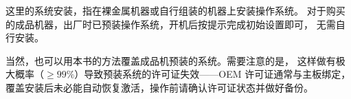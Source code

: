 这里的系统安装，指在裸金属机器或自行组装的机器上安装操作系统。
对于购买的成品机器，出厂时已预装操作系统，开机后按提示完成初始设置即可，
无需自行安装。

当然，也可以用本书的方法覆盖成品机预装的系统。需要注意的是，
这样做有极大概率（$\geq 99\%$）导致预装系统的许可证失效——OEM 许可证通常与主板绑定，
覆盖安装后未必能自动恢复激活，操作前请确认许可证状态并做好备份。


